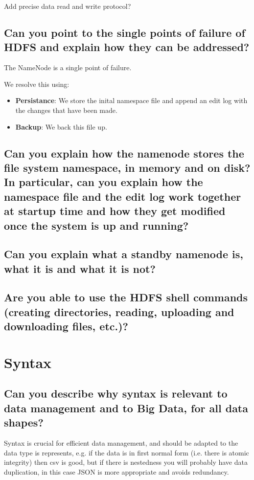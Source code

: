 \documentclass{article}
\begin{document}
{\color{red} Add precise data read and write protocol?}

\subsection{Can you point to the single points of failure of HDFS and explain how they can be addressed?}

The NameNode is a single point of failure.

We resolve this using:

\begin{itemize}
    \item \textbf{Persistance}: We store the inital namespace file and append an edit log with the changes that have been made.
    \item \textbf{Backup}: We back this file up.
\end{itemize}


\subsection{Can you explain how the namenode stores the file system namespace, in memory and on disk? In particular, can you explain how the namespace file and the edit log work together at startup time and how they get modified once the system is up and running?}
\subsection{Can you explain what a standby namenode is, what it is and what it is not?}
\subsection{Are you able to use the HDFS shell commands (creating directories, reading, uploading and downloading files, etc.)?}

\pagebreak

\section{Syntax}
\subsection{Can you describe why syntax is relevant to data management and to Big Data, for all data shapes?}

Syntax is crucial for efficient data management, and should be adapted to the data type is represents, e.g. if the data is in first normal form (i.e. there is atomic integrity) then csv is good, but if there is nestedness you will probably have data duplication, in this case JSON is more appropriate and avoids redundancy.
\end{document}
